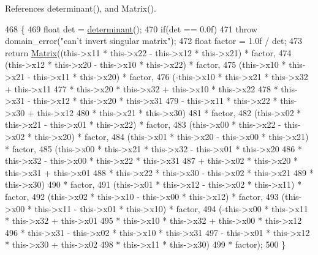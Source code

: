 References determinant(), and Matrix().


\begin{DoxyCode}
468         \{
469             \textcolor{keywordtype}{float} det = \hyperlink{classMatrix_aadfa353962ca1bf43ed148d79cc71fc6}{determinant}();
470             \textcolor{keywordflow}{if}(det == 0.0f)
471                 \textcolor{keywordflow}{throw} domain\_error(\textcolor{stringliteral}{"can't invert singular matrix"});
472             \textcolor{keywordtype}{float} factor = 1.0f / det;
473             \textcolor{keywordflow}{return} \hyperlink{classMatrix_a2dba13c45127354c9f75ef576f49269b}{Matrix}((this->x11 * this->x22 - this->x12 * this->x21) * factor,
474                     (this->x12 * this->x20 - this->x10 * this->x22) * factor,
475                     (this->x10 * this->x21 - this->x11 * this->x20) * factor,
476                     (-this->x10 * this->x21 * this->x32 + this->x11
477                      * this->x20 * this->x32 + this->x10 * this->x22
478                      * this->x31 - this->x12 * this->x20 * this->x31
479                      - this->x11 * this->x22 * this->x30 + this->x12
480                      * this->x21 * this->x30)
481                     * factor,
482                     (this->x02 * this->x21 - this->x01 * this->x22) * factor,
483                     (this->x00 * this->x22 - this->x02 * this->x20) * factor,
484                     (this->x01 * this->x20 - this->x00 * this->x21) * factor,
485                     (this->x00 * this->x21 * this->x32 - this->x01 * this->x20
486                      * this->x32 - this->x00 * this->x22 * this->x31
487                      + this->x02 * this->x20 * this->x31 + this->x01
488                      * this->x22 * this->x30 - this->x02 * this->x21
489                      * this->x30)
490                     * factor,
491                     (this->x01 * this->x12 - this->x02 * this->x11) * factor,
492                     (this->x02 * this->x10 - this->x00 * this->x12) * factor,
493                     (this->x00 * this->x11 - this->x01 * this->x10) * factor,
494                     (-this->x00 * this->x11 * this->x32 + this->x01
495                      * this->x10 * this->x32 + this->x00 * this->x12
496                      * this->x31 - this->x02 * this->x10 * this->x31
497                      - this->x01 * this->x12 * this->x30 + this->x02
498                      * this->x11 * this->x30)
499                         * factor);
500         \}
\end{DoxyCode}
